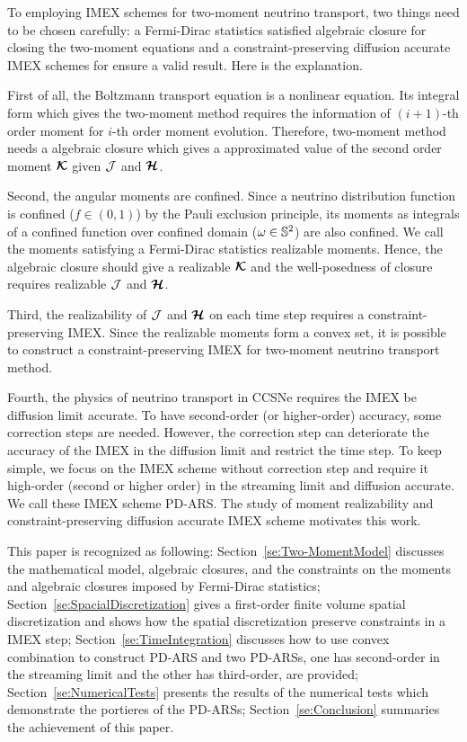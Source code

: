 
To employing IMEX schemes for two-moment neutrino transport, two things need to be chosen carefully: a Fermi-Dirac statistics satisfied algebraic closure for closing the two-moment equations and a constraint-preserving diffusion accurate IMEX schemes for ensure a valid result.
Here is the explanation.

First of all, the Boltzmann transport equation is a nonlinear equation.
Its integral form which gives the two-moment method requires the information of $(i+1)$-th order moment for $i$-th order moment evolution.
Therefore, two-moment method needs a algebraic closure which gives a approximated value of the second order moment $\boldsymbol{\mathcal{K}}$ given $\mathcal{J}$ and $\boldsymbol{\mathcal{H}}$.

Second, the angular moments are confined.
Since a neutrino distribution function is confined ($f\in(0,1)$) by the Pauli exclusion principle, its moments as integrals of a confined function over confined domain ($\omega\in\mathbb{S}^{2}$) are also confined.
We call the moments satisfying a Fermi-Dirac statistics realizable moments.
Hence, the algebraic closure should give a realizable $\boldsymbol{\mathcal{K}}$ and the well-posedness of closure requires realizable $\mathcal{J}$ and $\boldsymbol{\mathcal{H}}$.

Third, the realizability of $\mathcal{J}$ and $\boldsymbol{\mathcal{H}}$ on each time step requires a constraint-preserving IMEX.
Since the realizable moments form a convex set, it is possible to construct a constraint-preserving IMEX for two-moment neutrino transport method.

Fourth, the physics of neutrino transport in CCSNe requires the IMEX be diffusion limit accurate.
To have second-order (or higher-order) accuracy, some correction steps are needed.
However, the correction step can deteriorate the accuracy of the IMEX in the diffusion limit and restrict the time step.
To keep simple, we focus on the IMEX scheme without correction step and require it high-order (second or higher order) in the streaming limit and diffusion accurate.
We call these IMEX scheme PD-ARS.
The study of moment realizability and constraint-preserving diffusion accurate IMEX scheme motivates this work.

This paper is recognized as following: Section~\ref{se:Two-MomentModel} discusses the mathematical model, algebraic closures, and the constraints on the moments and algebraic closures imposed by Fermi-Dirac statistics;
Section~\ref{se:SpacialDiscretization} gives a first-order finite volume spatial discretization and shows how the spatial discretization preserve constraints in a IMEX step;
Section~\ref{se:TimeIntegration} discusses how to use convex combination to construct PD-ARS and two PD-ARSs, one has second-order in the streaming limit and the other has third-order, are provided;
Section~\ref{se:NumericalTests} presents the results of the numerical tests which demonstrate the portieres of the PD-ARSs; Section~\ref{se:Conclusion} summaries the achievement of this paper.